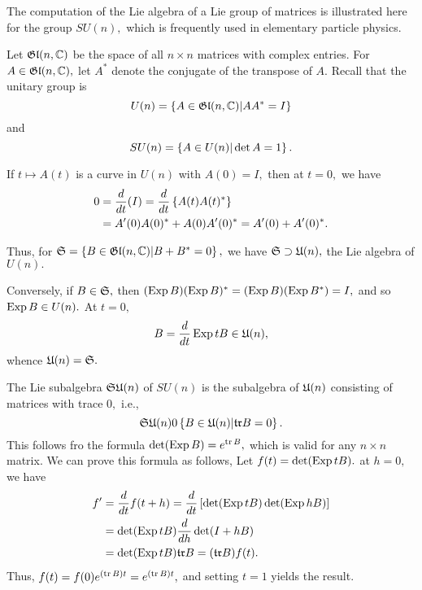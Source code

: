 \begin{exmp}
The computation of the Lie algebra of a Lie group of matrices is illustrated here for the group $SU(n),$ which is
frequently used in elementary particle physics.

Let $\mathfrak{Gl}(n, \mathbb C)$ be the space of all $n \times n$ matrices with complex entries. For $A \in \mathfrak{Gl}(n, \mathbb C),$ let
$A^{*}$ denote the conjugate of the transpose of $A.$ Recall that the unitary group is $$U(n)=\left\{ A \in \mathfrak{Gl}(n,
\mathbb C)| A A^{*}=I \right\}$$ and $$SU(n)=\left\{ A \in U(n)| \det A =1 \right\}.$$

If $t \mapsto A(t)$ is a curve in $U(n)$ with $A(0)=I,$ then at $t=0,$ we have
\begin{align*}
 0&=\frac{d}{dt}(I)=\frac{d}{dt}\left\{ A(t)A(t)^{*} \right\} \\
&= {A}^{\prime}(0)A(0)^{*}+ A(0){A}^{\prime}(0)^{*}={A}^{\prime}(0)+{A}^{\prime}(0)^{*}.
\end{align*}

Thus, for $\mathfrak{S}=\left\{ B \in \mathfrak{Gl}(n, \mathbb C)| B + B^{*}=0 \right\},$ we have $\mathfrak{S} \supset \mathfrak{U}(n),$ the Lie algebra of
$U(n).$

Conversely, if $B \in \mathfrak{S},$ then $(\operatorname{Exp} B)(\operatorname{Exp} B)^{*}=(\operatorname{Exp} B)(\operatorname{Exp} B^{*})=I,$ and so $\operatorname{Exp} B \in U(n).$ At $t=0,$
$$
B=\frac{d}{dt}\operatorname{Exp} tB \in \mathfrak{U}(n),
$$
whence $\mathfrak{U}(n)= \mathfrak{S}.$

The Lie subalgebra $\mathfrak{SU}(n)$ of $SU(n)$ is the subalgebra of $\mathfrak{U}(n)$ consisting of matrices with trace $0,$
i.e., $$
\mathfrak{SU}(n)0\left\{ B \in \mathfrak{U}(n)| \mathfrak{tr} B=0 \right\}.
$$
This follows fro the formula $\det (\operatorname{Exp} B)=e^{\operatorname{tr}B},$ which is valid for any $n \times n$ matrix. We can prove
this formula as follows, Let $f(t)=\det (\operatorname{Exp} tB). $ at $h=0,$ we have
\begin{align*}
 {f}^{\prime}&=\frac{d}{dt}f(t+h)=\frac{d}{dt}\left[\det (\operatorname{Exp} tB) \det(\operatorname{Exp} hB)\right] \\
&=\det(\operatorname{Exp} tB)\frac{d}{dh}\det(I+hB)\\
&=\det(\operatorname{Exp} tB)\mathfrak{tr} B =(\mathfrak{tr}B)f(t).
\end{align*}
Thus, $f(t)=f(0)e^{(\operatorname{tr}B)t}=e^{(\operatorname{tr}B)t},$ and setting $t=1$ yields the result.


\end{exmp}









